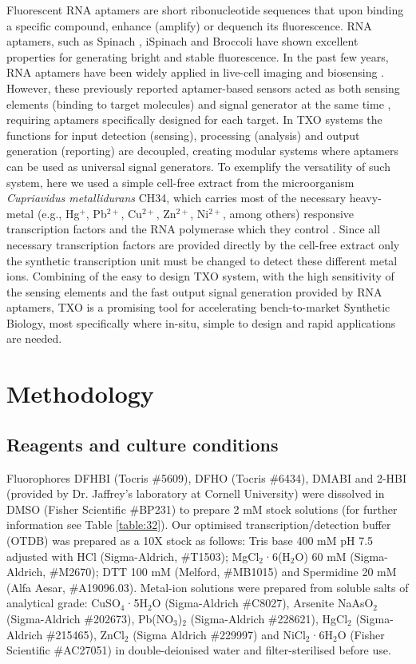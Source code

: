 Fluorescent RNA aptamers are short ribonucleotide sequences that upon binding a specific compound, enhance (amplify) or dequench its fluorescence. RNA aptamers, such as Spinach \citep{paige2011rna}, iSpinach \citep{autour2016ispinach} and Broccoli \citep{filonov2014broccoli} have shown excellent properties for generating bright and stable fluorescence. In the past few years, RNA aptamers have been widely applied in live-cell imaging \citep{neubacher2019rna} and biosensing \citep{cho2009applications}. However, these previously reported aptamer-based sensors acted as both sensing elements (binding to target molecules) and signal generator at the same time \citep{dehghani2018aptamer,razmi2018recent}, requiring aptamers specifically designed for each target. 
In TXO systems the functions for input detection (sensing), processing (analysis) and output generation (reporting) are decoupled, creating modular systems where aptamers can be used as universal signal generators. To exemplify the versatility of such system, here we used a simple cell-free extract from the microorganism \textit{Cupriavidus metallidurans} CH34, which carries most of the necessary heavy-metal (e.g., Hg$^+$, Pb$^{2+}$, Cu$^{2+}$, Zn$^{2+}$, Ni$^{2+}$, among others) responsive transcription factors and the RNA polymerase which they control \citep{monchy2007plasmids}. Since all necessary transcription factors are provided directly by the cell-free extract only the synthetic transcription unit must be changed to detect these different metal ions. Combining of the easy to design TXO system, with the high sensitivity of the sensing elements and the fast output signal generation provided by RNA aptamers, TXO is a promising tool for accelerating bench-to-market Synthetic Biology, most specifically where in-situ, simple to design and rapid applications are needed.


\section{Methodology}

\subsection*{Reagents and culture conditions}
Fluorophores DFHBI (Tocris \#5609), DFHO (Tocris \#6434), DMABI and 2-HBI (provided by Dr. Jaffrey’s laboratory at Cornell University) were dissolved in DMSO (Fisher Scientific \#BP231) to prepare 2 mM stock solutions (for further information see Table \ref{table:32}). Our optimised transcription/detection buffer (OTDB) was prepared as a 10X stock as follows: Tris base 400 mM pH 7.5 adjusted with HCl (Sigma-Aldrich, \#T1503); MgCl$_2$·6(H$_2$O) 60 mM (Sigma-Aldrich, \#M2670); DTT 100 mM (Melford, \#MB1015) and Spermidine 20 mM (Alfa Aesar, \#A19096.03). Metal-ion solutions were prepared from soluble salts of analytical grade: CuSO$_4$·5H$_2$O (Sigma-Aldrich \#C8027), Arsenite NaAsO$_2$ (Sigma-Aldrich \#202673), Pb(NO$_3$)$_2$ (Sigma-Aldrich \#228621), HgCl$_2$ (Sigma-Aldrich \#215465), ZnCl$_2$ (Sigma Aldrich \#229997) and NiCl$_2$·6H$_2$O (Fisher Scientific \#AC27051) in double-deionised water and filter-sterilised before use.


